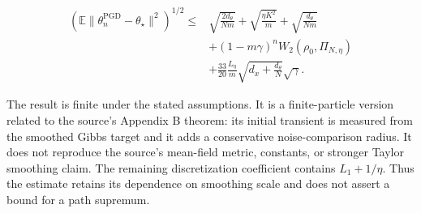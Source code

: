 \documentclass[11pt,a4paper]{article}
\begin{document}
\[
\begin{aligned}
\left(\mathbb E\|\theta^{\mathrm{PGD}}_n-\theta_\star\|^2\right)^{1/2}
\le{}&\sqrt{\frac{2d_\theta}{Nm}}
 +\sqrt{\frac{\eta K^2}{m}}+\sqrt{\frac{d_\theta}{Nm}}\\
&+(1-m\gamma)^nW_2(\rho_0,\Pi_{N,\eta})\\
&+\frac{33}{20}\frac{L_\eta}{m}
 \sqrt{d_x+\frac{d_\theta}{N}}\sqrt\gamma.
\end{aligned}
\]

The result is finite under the stated assumptions. It is a finite-particle version related to the source’s Appendix B theorem: its initial transient is measured from the smoothed Gibbs target and it adds a conservative noise-comparison radius. It does not reproduce the source’s mean-field metric, constants, or stronger Taylor smoothing claim. The remaining discretization coefficient contains \(L_1+1/\eta\). Thus the estimate retains its dependence on smoothing scale and does not assert a bound for a path supremum.
\end{document}
